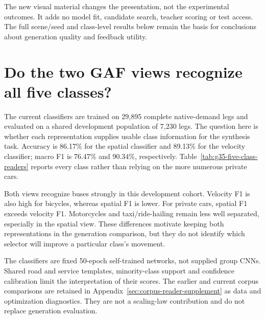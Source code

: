 
The new visual material changes the presentation, not the experimental outcomes. It adds no model fit, candidate search, teacher scoring or test access. The full scene/seed and class-level results below remain the basis for conclusions about generation quality and feedback utility.

\FloatBarrier
\section{Do the two GAF views recognize all five classes?}
\label{sec:expanded-recognition}
The current classifiers are trained on 29,895 complete native-demand legs and evaluated on a shared development population of 7,230 legs. The question here is whether each representation supplies usable class information for the synthesis task. Accuracy is 86.17\% for the spatial classifier and 89.13\% for the velocity classifier; macro F1 is 76.47\% and 90.34\%, respectively. Table~\ref{tab:g35-five-class-readers} reports every class rather than relying on the more numerous private cars.



Both views recognize buses strongly in this development cohort. Velocity F1 is also high for bicycles, whereas spatial F1 is lower. For private cars, spatial F1 exceeds velocity F1. Motorcycles and taxi/ride-hailing remain less well separated, especially in the spatial view. These differences motivate keeping both representations in the generation comparison, but they do not identify which selector will improve a particular class's movement.

The classifiers are fixed 50-epoch self-trained networks, not supplied group CNNs. Shared road and service templates, minority-class support and confidence calibration limit the interpretation of their scores. The earlier and current corpus comparisons are retained in Appendix~\ref{sec:corpus-reader-supplement} as data and optimization diagnostics. They are not a scaling-law contribution and do not replace generation evaluation.

